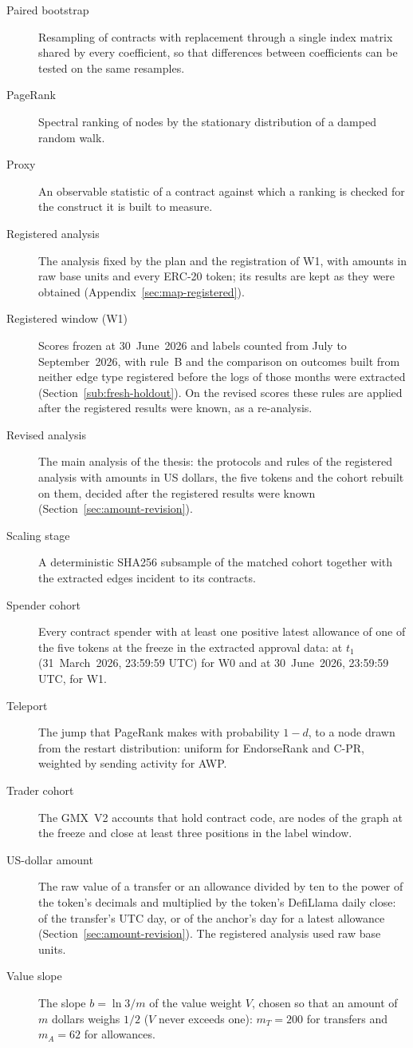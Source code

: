 \begin{description}
\item[Paired bootstrap] Resampling of contracts with replacement through a single index matrix shared by every coefficient, so that differences between coefficients can be tested on the same resamples.
\item[PageRank] Spectral ranking of nodes by the stationary distribution of a damped random walk.
\item[Proxy] An observable statistic of a contract against which a ranking is checked for the construct it is built to measure.
\item[Registered analysis] The analysis fixed by the plan and the registration of W1, with amounts in raw base units and every ERC-20 token; its results are kept as they were obtained (Appendix~\ref{sec:map-registered}).
\item[Registered window (W1)] Scores frozen at 30~June~2026 and labels counted from July to September~2026, with rule~B and the comparison on outcomes built from neither edge type registered before the logs of those months were extracted (Section~\ref{sub:fresh-holdout}). On the revised scores these rules are applied after the registered results were known, as a re-analysis.
\item[Revised analysis] The main analysis of the thesis: the protocols and rules of the registered analysis with amounts in US dollars, the five tokens and the cohort rebuilt on them, decided after the registered results were known (Section~\ref{sec:amount-revision}).
\item[Scaling stage] A deterministic SHA256 subsample of the matched cohort together with the extracted edges incident to its contracts.
\item[Spender cohort] Every contract spender with at least one positive latest allowance of one of the five tokens at the freeze in the extracted approval data: at $t_1$ (31~March~2026, 23:59:59 UTC) for W0 and at 30~June~2026, 23:59:59 UTC, for W1.
\item[Teleport] The jump that PageRank makes with probability $1-d$, to a node drawn from the restart distribution: uniform for EndorseRank and C-PR, weighted by sending activity for AWP.
\item[Trader cohort] The GMX~V2 accounts that hold contract code, are nodes of the graph at the freeze and close at least three positions in the label window.
\item[US-dollar amount] The raw value of a transfer or an allowance divided by ten to the power of the token's decimals and multiplied by the token's DefiLlama daily close: of the transfer's UTC day, or of the anchor's day for a latest allowance (Section~\ref{sec:amount-revision}). The registered analysis used raw base units.
\item[Value slope] The slope $b=\ln 3/m$ of the value weight $V$, chosen so that an amount of $m$ dollars weighs $1/2$ ($V$ never exceeds one): $m_T=200$ for transfers and $m_A=62$ for allowances.
\end{description}







